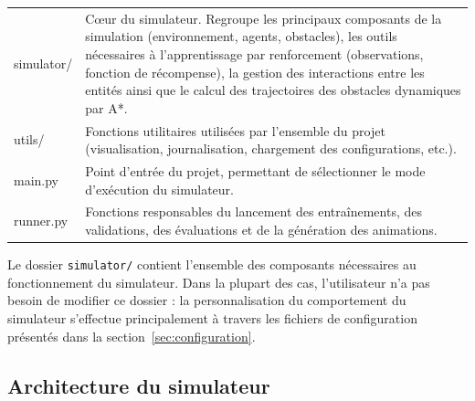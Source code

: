 \begin{table}[h]
\begin{tabularx}{\textwidth}{>{\ttfamily\small}l X}
        simulator/                    & Cœur du simulateur. Regroupe les principaux composants de la simulation (environnement, agents, obstacles), les outils nécessaires à l'apprentissage par renforcement (observations, fonction de récompense), la gestion des interactions entre les entités ainsi que le calcul des trajectoires des obstacles dynamiques par A*. \\
        utils/                        & Fonctions utilitaires utilisées par l'ensemble du projet (visualisation, journalisation, chargement des configurations, etc.).                                                                                                                                                                                                    \\

        main.py                       & Point d'entrée du projet, permettant de sélectionner le mode d'exécution du simulateur.                                                                                                                                                                                                                                           \\
        runner.py                     & Fonctions responsables du lancement des entraînements, des validations, des évaluations et de la génération des animations.                                                                                                                                                                                                       \\
        \bottomrule
    \end{tabularx}
\end{table}

\begin{tcolorbox}[colback=YellowGreen!5,colframe=YellowGreen,title=Remarque]
    Le dossier \texttt{simulator/} contient l'ensemble des composants nécessaires au fonctionnement du simulateur. Dans la plupart des cas, l'utilisateur n'a pas besoin de modifier ce dossier : la personnalisation du comportement du simulateur s'effectue principalement à travers les fichiers de configuration présentés dans la section~\ref{sec:configuration}.
\end{tcolorbox}

\subsection{Architecture du simulateur}


